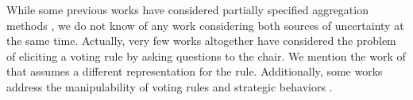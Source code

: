 \documentclass{article}
\begin{document}
While some previous works have considered partially specified aggregation methods \citep{Stein1994,Llamazares2013,Viappiani2018}, we do not know of any work considering both sources of uncertainty at the same time. 
Actually, very few works altogether have considered the problem of eliciting a voting rule by asking questions to the chair. We mention the work of  that assumes a different representation for the rule. %
Additionally, some works address the manipulability of voting rules \citep{Elkind2012,Dey2018,Dey2018_2,Conitzer2011,Baumeister2019} and 
strategic behaviors \citep{Endriss2016,Lev2019,Annemieke2012}.
\end{document}
